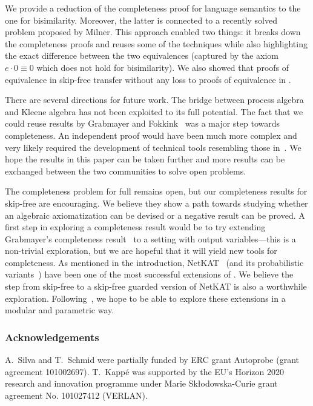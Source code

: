 \documentclass[orivec,envcountsect,envcountsame]{llncs}
\begin{document}
We provide a reduction of the completeness proof for language semantics to the one for bisimilarity. Moreover, the latter is connected to a recently solved~\cite{regexlics} problem proposed by Milner. This approach enabled two things: it breaks down the completeness proofs and reuses some of the techniques while also highlighting the exact difference between the two equivalences (captured by the axiom $e\cdot 0\equiv 0$ which does not hold for bisimilarity). We also showed that proofs of equivalence in skip-free \GKAT transfer without any loss to proofs of equivalence in \GKAT. %

There are several directions for future work. The bridge between process algebra and Kleene algebra has not been exploited to its full potential. The fact that we could reuse results by Grabmayer and Fokkink~\cite{regexlics,onefreeregexlics} was a major step towards completeness. An independent proof would have been much more complex and very likely required the development of technical tools resembling those in~\cite{regexlics,onefreeregexlics}. We hope the results in this paper can be taken further and more results can be exchanged between the two communities to solve open problems.

The completeness problem for full \GKAT remains open, but our completeness results for skip-free \GKAT are encouraging.
We believe they show a path towards studying whether an algebraic axiomatization can be devised or a negative result can be proved.
A first step in exploring a completeness result would be to try extending Grabmayer's completeness result~\cite{regexlics} to a setting with output variables---this is a non-trivial exploration, but we are hopeful that it will yield new tools for completeness.
As mentioned in the introduction, \textsf{NetKAT}~\cite{netkat} (and its probabilistic variants~\cite{probnetkat,cantorscott}) have been one of the most successful extensions of \KAT. We believe the step from skip-free \GKAT to a skip-free guarded version of \textsf{NetKAT} is also a worthwhile exploration. Following~\cite{kmt}, we hope to be able to explore these extensions in a modular and parametric way. %

\subsubsection*{Acknowledgements}{A.~Silva and T.~Schmid were partially funded by ERC grant Autoprobe (grant agreement 101002697). T.~Kapp\'{e} was supported by the EU’s Horizon 2020 research and innovation programme under Marie Sk\l{}odowska-Curie grant agreement No. 101027412 (VERLAN).}
\end{document}

